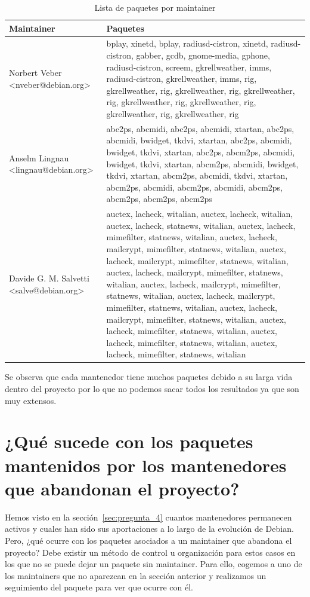 \documentclass[a4paper, 12pt]{book}
\begin{document}
	
	\begin{table}[h!]
		\centering
		\begin{tabular}{|l|p{10cm}|}
			\hline
			\textbf{Maintainer} & \textbf{Paquetes} \\
			\hline
			Norbert Veber \textless{}nveber@debian.org\textgreater{} & bplay, xinetd, bplay, radiusd-cistron, xinetd, radiusd-cistron, gabber, gcdb, gnome-media, gphone, radiusd-cistron, screem, gkrellweather, imms, radiusd-cistron, gkrellweather, imms, rig, gkrellweather, rig, gkrellweather, rig, gkrellweather, rig, gkrellweather, rig, gkrellweather, rig, gkrellweather, rig, gkrellweather, rig \\
			\hline
			Anselm Lingnau \textless{}lingnau@debian.org\textgreater{} & abc2ps, abcmidi, abc2ps, abcmidi, xtartan, abc2ps, abcmidi, bwidget, tkdvi, xtartan, abc2ps, abcmidi, bwidget, tkdvi, xtartan, abc2ps, abcm2ps, abcmidi, bwidget, tkdvi, xtartan, abcm2ps, abcmidi, bwidget, tkdvi, xtartan, abcm2ps, abcmidi, tkdvi, xtartan, abcm2ps, abcmidi, abcm2ps, abcmidi, abcm2ps, abcm2ps, abcm2ps, abcm2ps \\
			\hline
			Davide G. M. Salvetti \textless{}salve@debian.org\textgreater{} & auctex, lacheck, witalian, auctex, lacheck, witalian, auctex, lacheck, statnews, witalian, auctex, lacheck, mimefilter, statnews, witalian, auctex, lacheck, mailcrypt, mimefilter, statnews, witalian, auctex, lacheck, mailcrypt, mimefilter, statnews, witalian, auctex, lacheck, mailcrypt, mimefilter, statnews, witalian, auctex, lacheck, mailcrypt, mimefilter, statnews, witalian, auctex, lacheck, mailcrypt, mimefilter, statnews, witalian, auctex, lacheck, mailcrypt, mimefilter, statnews, witalian, auctex, lacheck, mimefilter, statnews, witalian, auctex, lacheck, mimefilter, statnews, witalian, auctex, lacheck, mimefilter, statnews, witalian \\
			\hline
		\end{tabular}
		\caption{Lista de paquetes por maintainer}
	\end{table}







Se observa que cada mantenedor tiene muchos paquetes debido a su larga vida dentro del proyecto por lo que no podemos sacar todos los resultados ya que son muy extensos.


\section{¿Qué sucede con los paquetes mantenidos por los mantenedores que abandonan el proyecto?}
\label{sec:pregunta_5}
Hemos visto en la sección~\ref{sec:pregunta_4} cuantos mantenedores permanecen activos y cuales han sido sus aportaciones a lo largo de la evolución de Debian. 
Pero, ¿qué ocurre con los paquetes asociados a un maintainer que abandona el proyecto?
Debe existir un método de control u organización para estos casos en los que no se puede dejar un paquete sin maintainer.
Para ello, cogemos a uno de los maintainers que no aparezcan en la sección anterior y realizamos un seguimiento del paquete para ver que ocurre con él.
\end{document}
